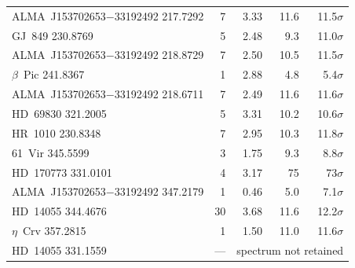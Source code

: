 \begin{tabular}{@{}l@{~~}r@{~~}r@{~~}r@{~~}r@{}}
ALMA~J153702653$-$33192492 217.7292 & 7 & 3.33 & 11.6 & 11.5$\sigma$ \\
GJ~849 230.8769 & 5 & 2.48 & 9.3 & 11.0$\sigma$ \\
ALMA~J153702653$-$33192492 218.8729 & 7 & 2.50 & 10.5 & 11.5$\sigma$ \\
$\beta$~Pic 241.8367 & 1 & 2.88 & 4.8 & 5.4$\sigma$ \\
ALMA~J153702653$-$33192492 218.6711 & 7 & 2.49 & 11.6 & 11.6$\sigma$ \\
HD~69830 321.2005 & 5 & 3.31 & 10.2 & 10.6$\sigma$ \\
HR~1010 230.8348 & 7 & 2.95 & 10.3 & 11.8$\sigma$ \\
61~Vir 345.5599 & 3 & 1.75 & 9.3 & 8.8$\sigma$ \\
HD~170773 331.0101 & 4 & 3.17 & 75 & 73$\sigma$ \\
ALMA~J153702653$-$33192492 347.2179 & 1 & 0.46 & 5.0 & 7.1$\sigma$ \\
HD~14055 344.4676 & 30 & 3.68 & 11.6 & 12.2$\sigma$ \\
$\eta$~Crv 357.2815 & 1 & 1.50 & 11.0 & 11.6$\sigma$ \\
HD~14055 331.1559 & --- & \multicolumn{3}{l}{spectrum not retained} \\
\hline
\end{tabular}
